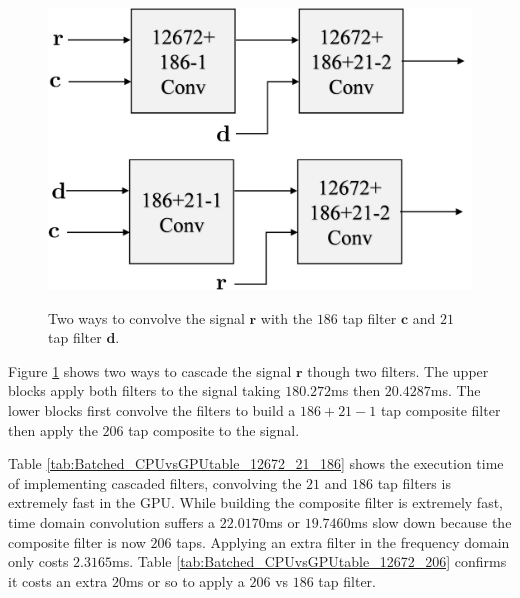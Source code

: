 \begin{figure}
	\caption{Two ways to convolve the signal $\mathbf{r}$ with the $186$ tap filter $\mathbf{c}$ and $21$ tap filter $\mathbf{d}$.}
	\centering\includegraphics[width=5.01in/100*55]{figures/gpu_intro/twoWaysToConv.pdf}
	\label{fig:twoWaysToConv}
\end{figure}
Figure \ref{fig:twoWaysToConv} shows two ways to cascade the signal $\mathbf{r}$ though two filters.
The upper blocks apply both filters to the signal taking $180.272$ms then $20.4287$ms.
The lower blocks first convolve the filters to build a $186+21-1$ tap composite filter then apply the $206$ tap composite to the signal.

Table \ref{tab:Batched_CPUvsGPUtable_12672_21_186} shows the execution time of implementing cascaded filters, convolving the $21$ and $186$ tap filters is extremely fast in the GPU.
While building the composite filter is extremely fast, time domain convolution suffers a $22.0170$ms or $19.7460$ms slow down because the composite filter is now $206$ taps.
Applying an extra filter in the frequency domain only costs $2.3165$ms.
Table \ref{tab:Batched_CPUvsGPUtable_12672_206} confirms it costs an extra $20$ms or so to apply a $206$ vs $186$ tap filter.

